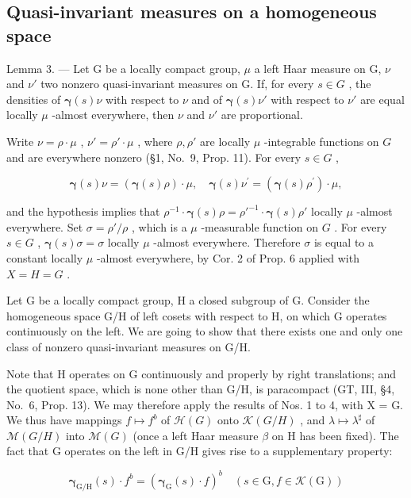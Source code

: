 \subsection{Quasi-invariant measures on a homogeneous space}

Lemma 3. --- Let G be a locally compact group, \(\mu\) a left Haar measure on G, \(\nu\) and \(\nu'\) two nonzero quasi-invariant measures on G. If, for every \(s \in G\) , the densities of \(\boldsymbol{\gamma}(s)\nu\) with respect to \(\nu\) and of \(\boldsymbol{\gamma}(s)\nu'\) with respect to \(\nu'\) are equal locally \(\mu\) -almost everywhere, then \(\nu\) and \(\nu'\) are proportional.

Write \(\nu = \rho \cdot \mu\) , \(\nu' = \rho' \cdot \mu\) , where \(\rho, \rho'\) are locally \(\mu\) -integrable functions on \(G\) and are everywhere nonzero (§1, No.~9, Prop. 11). For every \(s \in G\) ,

\[
\boldsymbol {\gamma} (s) \nu = (\boldsymbol {\gamma} (s) \rho) \cdot \mu , \quad \boldsymbol {\gamma} (s) \nu^ {\prime} = (\boldsymbol {\gamma} (s) \rho^ {\prime}) \cdot \mu ,
\]

and the hypothesis implies that \(\rho^{-1} \cdot \pmb{\gamma}(s) \rho = \rho'^{-1} \cdot \pmb{\gamma}(s) \rho'\) locally \(\mu\) -almost everywhere. Set \(\sigma = \rho'/\rho\) , which is a \(\mu\) -measurable function on \(G\) . For every \(s \in G\) , \(\pmb{\gamma}(s) \sigma = \sigma\) locally \(\mu\) -almost everywhere. Therefore \(\sigma\) is equal to a constant locally \(\mu\) -almost everywhere, by Cor. 2 of Prop. 6 applied with \(X = H = G\) .

Let G be a locally compact group, H a closed subgroup of G. Consider the homogeneous space G/H of left cosets with respect to H, on which G operates continuously on the left. We are going to show that there exists one and only one class of nonzero quasi-invariant measures on G/H.

Note that H operates on G continuously and properly by right translations; and the quotient space, which is none other than G/H, is paracompact (GT, III, §4, No.~6, Prop. 13). We may therefore apply the results of Nos. 1 to 4, with X = G. We thus have mappings \(f \mapsto f^{b}\) of \(\mathcal{H}(G)\) onto \(\mathcal{K}(G/H)\) , and \(\lambda \mapsto \lambda^{\sharp}\) of \(\mathcal{M}(G/H)\) into \(\mathcal{M}(G)\) (once a left Haar measure \(\beta\) on H has been fixed). The fact that G operates on the left in G/H gives rise to a supplementary property:

\[
\boldsymbol {\gamma} _ {\mathrm{G/H}} (s) \cdot f ^ {b} = \left(\boldsymbol {\gamma} _ {\mathrm{G}} (s) \cdot f\right) ^ {b} \quad \left(s \in \mathrm{G}, f \in \mathscr {K} (\mathrm{G})\right)\tag{15}
\]


